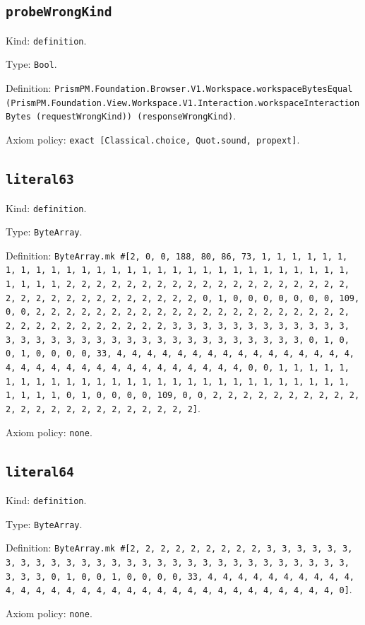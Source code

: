 \documentclass[11pt]{article}
\begin{document}
\subsection*{\texttt{probeWrongKind}}
\noindent Kind: \texttt{definition}.\par
\noindent Type: \texttt{Bool}.\par
\noindent Definition: \texttt{PrismPM.Foundation.Browser.V1.Workspace.workspaceBytesEqual (PrismPM.Foundation.View.Workspace.V1.Interaction.workspaceInteractionBytes (requestWrongKind)) (responseWrongKind)}.\par
\noindent Axiom policy: \texttt{exact [Classical.choice, Quot.sound, propext]}.\par
\subsection*{\texttt{literal63}}
\noindent Kind: \texttt{definition}.\par
\noindent Type: \texttt{ByteArray}.\par
\noindent Definition: \texttt{ByteArray.mk \#[2, 0, 0, 188, 80, 86, 73, 1, 1, 1, 1, 1, 1, 1, 1, 1, 1, 1, 1, 1, 1, 1, 1, 1, 1, 1, 1, 1, 1, 1, 1, 1, 1, 1, 1, 1, 1, 1, 1, 1, 2, 2, 2, 2, 2, 2, 2, 2, 2, 2, 2, 2, 2, 2, 2, 2, 2, 2, 2, 2, 2, 2, 2, 2, 2, 2, 2, 2, 2, 2, 2, 2, 0, 1, 0, 0, 0, 0, 0, 0, 0, 109, 0, 0, 2, 2, 2, 2, 2, 2, 2, 2, 2, 2, 2, 2, 2, 2, 2, 2, 2, 2, 2, 2, 2, 2, 2, 2, 2, 2, 2, 2, 2, 2, 2, 2, 3, 3, 3, 3, 3, 3, 3, 3, 3, 3, 3, 3, 3, 3, 3, 3, 3, 3, 3, 3, 3, 3, 3, 3, 3, 3, 3, 3, 3, 3, 3, 3, 0, 1, 0, 0, 1, 0, 0, 0, 0, 33, 4, 4, 4, 4, 4, 4, 4, 4, 4, 4, 4, 4, 4, 4, 4, 4, 4, 4, 4, 4, 4, 4, 4, 4, 4, 4, 4, 4, 4, 4, 4, 4, 0, 0, 1, 1, 1, 1, 1, 1, 1, 1, 1, 1, 1, 1, 1, 1, 1, 1, 1, 1, 1, 1, 1, 1, 1, 1, 1, 1, 1, 1, 1, 1, 1, 1, 0, 1, 0, 0, 0, 0, 109, 0, 0, 2, 2, 2, 2, 2, 2, 2, 2, 2, 2, 2, 2, 2, 2, 2, 2, 2, 2, 2, 2, 2, 2, 2]}.\par
\noindent Axiom policy: \texttt{none}.\par
\subsection*{\texttt{literal64}}
\noindent Kind: \texttt{definition}.\par
\noindent Type: \texttt{ByteArray}.\par
\noindent Definition: \texttt{ByteArray.mk \#[2, 2, 2, 2, 2, 2, 2, 2, 2, 3, 3, 3, 3, 3, 3, 3, 3, 3, 3, 3, 3, 3, 3, 3, 3, 3, 3, 3, 3, 3, 3, 3, 3, 3, 3, 3, 3, 3, 3, 3, 3, 0, 1, 0, 0, 1, 0, 0, 0, 0, 33, 4, 4, 4, 4, 4, 4, 4, 4, 4, 4, 4, 4, 4, 4, 4, 4, 4, 4, 4, 4, 4, 4, 4, 4, 4, 4, 4, 4, 4, 4, 4, 4, 0]}.\par
\noindent Axiom policy: \texttt{none}.\par
\end{document}
